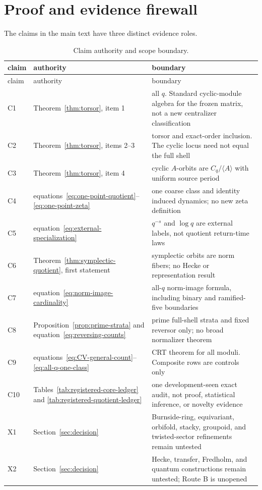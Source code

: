 \documentclass[11pt]{article}
\theoremstyle{definition}
\theoremstyle{remark}
\begin{document}
\appendix

\section{Proof and evidence firewall}
\label{app:firewall}

The claims in the main text have three distinct evidence roles.

\begin{longtable}{C{0.08\textwidth} p{0.39\textwidth} p{0.42\textwidth}}
\caption{Claim authority and scope boundary.}
\label{tab:claim-firewall}\\
\toprule
claim & authority & boundary \\
\midrule
\endfirsthead
\toprule
claim & authority & boundary \\
\midrule
\endhead
C1 & Theorem~\ref{thm:torsor}, item 1 & all \(q\). Standard cyclic-module
algebra for the frozen matrix, not a new centralizer classification \\
C2 & Theorem~\ref{thm:torsor}, items 2--3 & torsor and exact-order inclusion.
The cyclic locus need not equal the full shell \\
C3 & Theorem~\ref{thm:torsor}, item 4 & cyclic \(A\)-orbits are
\(C_q/\langle A\rangle\) with uniform source period \\
C4 & equations~\eqref{eq:one-point-quotient}--\eqref{eq:one-point-zeta} &
one coarse class and identity induced dynamics; no new zeta definition \\
C5 & equation~\eqref{eq:external-specialization} & \(q^{-s}\) and
\(\log q\) are external labels, not quotient return-time laws \\
C6 & Theorem~\ref{thm:symplectic-quotient}, first statement &
symplectic orbits are norm fibers; no Hecke or representation result \\
C7 & equation~\eqref{eq:norm-image-cardinality} & all-\(q\) norm-image
formula, including binary and ramified-five boundaries \\
C8 & Proposition~\ref{prop:prime-strata} and
equation~\eqref{eq:reversing-counts} & prime full-shell strata and fixed
reversor only; no broad normalizer theorem \\
C9 & equations~\eqref{eq:CV-general-count}--\eqref{eq:all-q-one-class} &
CRT theorem for all moduli. Composite rows are controls only \\
C10 & Tables~\ref{tab:registered-core-ledger} and
\ref{tab:registered-quotient-ledger} & one development-seen exact audit,
not proof, statistical inference, or novelty evidence \\
X1 & Section~\ref{sec:decision} & Burnside-ring, equivariant, orbifold,
stacky, groupoid, and twisted-sector refinements remain untested \\
X2 & Section~\ref{sec:decision} & Hecke, transfer, Fredholm, and quantum
constructions remain untested; Route B is unopened \\
\bottomrule
\end{longtable}
\end{document}
